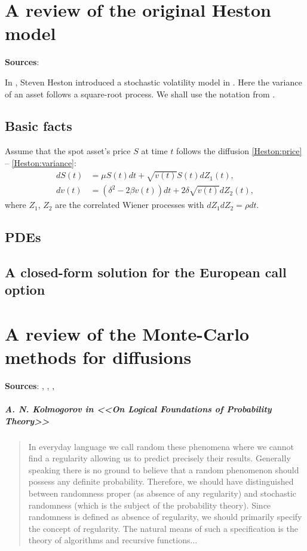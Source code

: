 \chapter{A review of the original Heston model}
    \textbf{Sources}:\cite{Gatheral2012}

    In \citeyear{Heston1993}, Steven Heston introduced a stochastic volatility model in \cite{Heston1993}. 
    Here the variance of an asset follows a square-root process. We shall use the notation from \cite{Zhitlukhin2022}.
    \section{Basic facts}
        Assume that the spot asset's price $S$ at time $t$ follows the diffusion \eqref{Heston:price} -- \eqref{Heston:variance}:
        \begin{align}
            dS(t) & = \mu S(t)dt + \sqrt{v(t)} S(t) dZ_1(t), \label{Heston:price}\\
            dv(t) & = \left(\delta^2 - 2\beta v(t)\right) dt + 2\delta \sqrt{v(t)} dZ_2(t), \label{Heston:variance}
        \end{align}
        where $Z_1$, $Z_2$ are the correlated Wiener processes with $dZ_1dZ_2 = \rho dt$.
    \section{PDEs}
    \section{A closed-form solution for the European call option}
\chapter{A review of the Monte-Carlo methods for diffusions}
    \textbf{Sources}: \cite{Kolmogorov1983}, \cite{Zhitlukhin2022}, \cite{KobelkovKitapbayev2022}, \cite{Kloeden1992}
        \paragraph*{A. N. Kolmogorov in <<On Logical Foundations of Probability Theory>>}
        \begin{quote}
            In everyday language we call random these phenomena where we cannot find a regularity allowing us to predict precisely their results. Generally speaking there is no ground to believe that a random phenomenon should possess any definite probability. Therefore, we should have distinguished between randomness proper
        (as absence of any regularity) and stochastic randomness (which is the subject of the probability theory).
        Since randomness is defined as absence of regularity, we should
        primarily specify the concept of regularity. The natural means of such a specification is the theory of algorithms and recursive functions...
        \end{quote}
